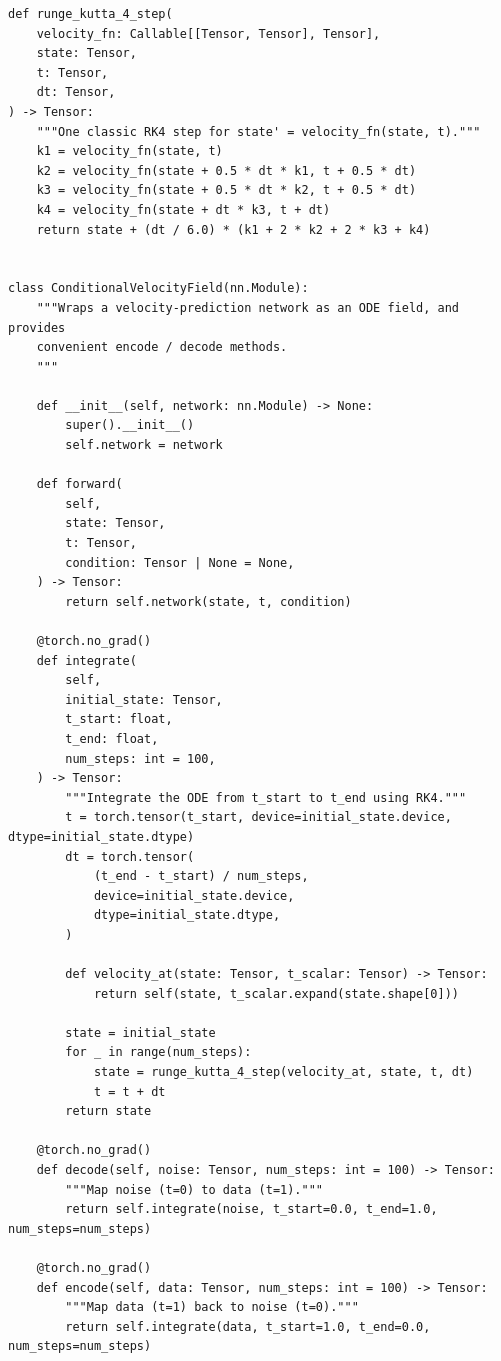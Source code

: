 \documentclass[usenames,dvipsnames]{article}
\begin{document}
\begin{verbatim}
def runge_kutta_4_step(
    velocity_fn: Callable[[Tensor, Tensor], Tensor],
    state: Tensor,
    t: Tensor,
    dt: Tensor,
) -> Tensor:
    """One classic RK4 step for state' = velocity_fn(state, t)."""
    k1 = velocity_fn(state, t)
    k2 = velocity_fn(state + 0.5 * dt * k1, t + 0.5 * dt)
    k3 = velocity_fn(state + 0.5 * dt * k2, t + 0.5 * dt)
    k4 = velocity_fn(state + dt * k3, t + dt)
    return state + (dt / 6.0) * (k1 + 2 * k2 + 2 * k3 + k4)


class ConditionalVelocityField(nn.Module):
    """Wraps a velocity-prediction network as an ODE field, and provides
    convenient encode / decode methods.
    """

    def __init__(self, network: nn.Module) -> None:
        super().__init__()
        self.network = network

    def forward(
        self,
        state: Tensor,
        t: Tensor,
        condition: Tensor | None = None,
    ) -> Tensor:
        return self.network(state, t, condition)

    @torch.no_grad()
    def integrate(
        self,
        initial_state: Tensor,
        t_start: float,
        t_end: float,
        num_steps: int = 100,
    ) -> Tensor:
        """Integrate the ODE from t_start to t_end using RK4."""
        t = torch.tensor(t_start, device=initial_state.device, dtype=initial_state.dtype)
        dt = torch.tensor(
            (t_end - t_start) / num_steps,
            device=initial_state.device,
            dtype=initial_state.dtype,
        )

        def velocity_at(state: Tensor, t_scalar: Tensor) -> Tensor:
            return self(state, t_scalar.expand(state.shape[0]))

        state = initial_state
        for _ in range(num_steps):
            state = runge_kutta_4_step(velocity_at, state, t, dt)
            t = t + dt
        return state

    @torch.no_grad()
    def decode(self, noise: Tensor, num_steps: int = 100) -> Tensor:
        """Map noise (t=0) to data (t=1)."""
        return self.integrate(noise, t_start=0.0, t_end=1.0, num_steps=num_steps)

    @torch.no_grad()
    def encode(self, data: Tensor, num_steps: int = 100) -> Tensor:
        """Map data (t=1) back to noise (t=0)."""
        return self.integrate(data, t_start=1.0, t_end=0.0, num_steps=num_steps)
\end{verbatim}
\end{document}

